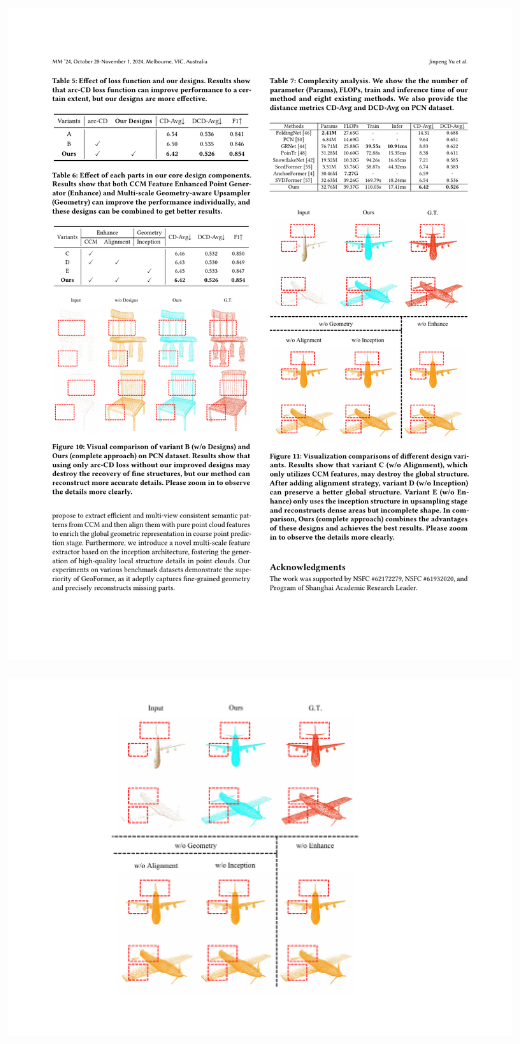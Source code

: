 \documentclass[landscape,a0paper,fontscale=0.292]{baposter}
\begin{document}
\begin{poster}
{\begin{minipage}[t]{0.49\textwidth}
\begin{minipage}[t]{0.48\textwidth}
\begin{center}
                \includegraphics[width=\textwidth]{images/table-ablation-design.pdf}
            \end{center}
        \end{minipage}\hfill
        \begin{minipage}[t]{0.52\textwidth}
            \text{}
            \vspace{-1.5em}
            \begin{center}
                \includegraphics[width=\textwidth]{images/result-ablation-design.pdf}
            \end{center}
        \end{minipage}
    \end{minipage}

}
\end{poster}
\end{document}
